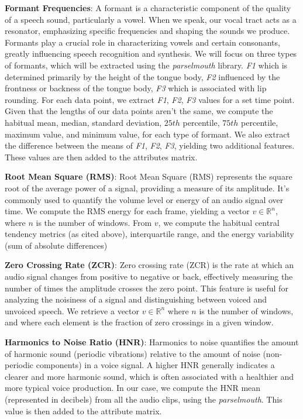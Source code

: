 \documentclass[twocolumn]{article}
\newcommand{\R}{\mathbb{R}}
\begin{document}
\textbf{Formant Frequencies}: 
A formant is a characteristic component of the quality of a speech sound, particularly a vowel. When we speak, our vocal tract acts as a resonator, emphasizing specific frequencies and shaping the sounds we produce. Formants play a crucial role in characterizing vowels and certain consonants, greatly influencing speech recognition and synthesis. We will focus on three types of formants, which will be extracted using the \textit{parselmouth} library. \textit{F1} which is determined primarily by the height of the tongue body, \textit{F2} influenced by the frontness or backness of the tongue body,  \textit{F3} which is associated with lip rounding. For each data point, we extract \textit{F1}, \textit{F2}, \textit{F3} values for a set time point. Given that the lengths of our data points aren't the same, we compute the habitual mean, median, standard deviation, $25th$ percentile, $75th$ percentile, maximum value, and minimum value, for each type of formant. We also extract the difference between the means of \textit{F1}, \textit{F2}, \textit{F3}, yielding two additional features. These values are then added to the attributes matrix. 

\textbf{Root Mean Square (RMS)}: Root Mean Square (RMS) represents the square root of the average power of a signal, providing a measure of its amplitude. It's commonly used to quantify the volume level or energy of an audio signal over time. We compute the RMS energy for each frame, yielding a vector $v \in \R^{n}$, where $n$ is the number of windows. From $v$, we compute the habitual central tendency metrics (as cited above), interquartile range, and the energy variability (sum of absolute differences)

\textbf{Zero Crossing Rate (ZCR)}: Zero crossing rate (ZCR) is the rate at which an audio signal changes from positive to negative or back, effectively measuring the number of times the amplitude crosses the zero point. This feature is useful for analyzing the noisiness of a signal and distinguishing between voiced and unvoiced speech. We retrieve a vector $v \in \R^{n}$ where $n$ is the number of windows, and where each element is the fraction of zero crossings in a given window.

\textbf{Harmonics to Noise Ratio (HNR)}:
Harmonics to noise quantifies the amount of harmonic sound (periodic vibrations) relative to the amount of noise (non-periodic components) in a voice signal. A higher HNR generally indicates a clearer and more harmonic sound, which is often associated with a healthier and more typical voice production. In our case, we compute the HNR mean (represented in decibels) from all the audio clips, using the \textit{parselmouth}. This value is then added to the attribute matrix. 
\end{document}
